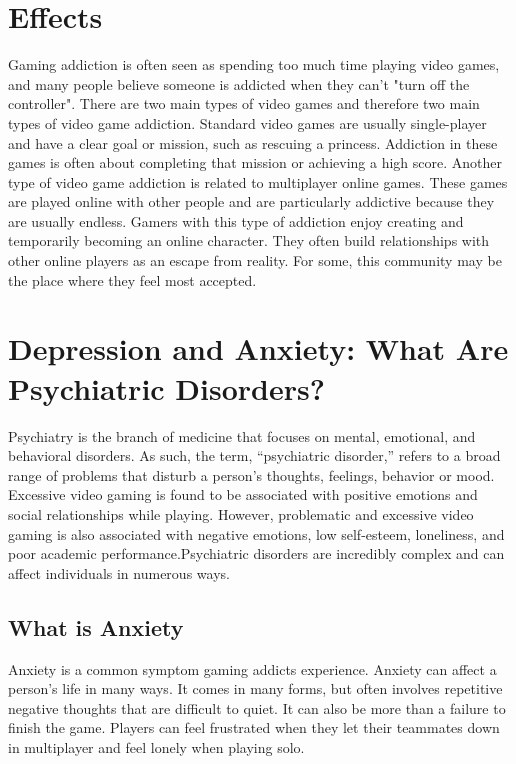 \documentclass[10pt,twoside,slovak,a4paper]{article}
\begin{document}
\section{Effects} 
Gaming addiction is often seen as spending too much time playing video games,
and many people believe someone is addicted when they can't "turn off the controller".
There are two main types of video games and therefore two main types of video game addiction. Standard video games are usually single-player and have a clear goal or mission, such as rescuing a princess. Addiction in these games is often about completing that mission or achieving a high score. Another type of video game addiction is related to multiplayer online games. These games are played online with other people and are particularly addictive because they are usually endless. Gamers with this type of addiction enjoy creating and temporarily becoming an online character. They often build relationships with other online players as an escape from reality. For some, this community may be the place where they feel most accepted.

\newpage

\section{Depression and Anxiety: What Are Psychiatric Disorders?}
Psychiatry is the branch of medicine that focuses on mental, emotional, and behavioral disorders\cite{healthygamer.gg}. As such, the term, “psychiatric disorder,” refers to a broad range of problems that disturb a person's thoughts, feelings, behavior or mood.
Excessive video gaming is found to be associated with positive emotions and social relationships while playing. \newline However, problematic and excessive video gaming is also associated with negative emotions, low self-esteem, loneliness, and poor academic performance.Psychiatric disorders are incredibly complex and can affect individuals in numerous ways.

\subsection{What  is Anxiety} \label{ina:este}
Anxiety is a common symptom gaming addicts experience. Anxiety can affect a person's life in many ways\cite{wired.com}. It comes in many forms, but often involves repetitive negative thoughts that are difficult to quiet. It can also be more than a failure to finish the game. Players can feel frustrated when they let their teammates down in multiplayer and feel lonely when playing solo.
\end{document}
